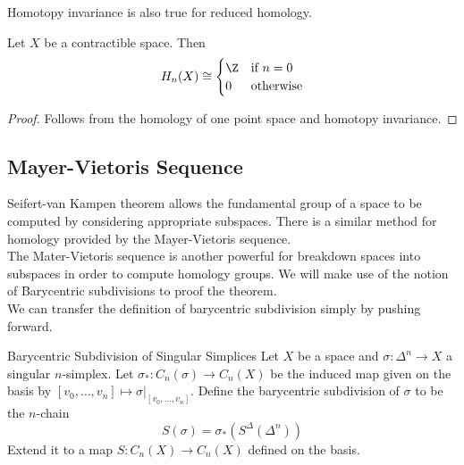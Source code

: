 \documentclass[a4paper]{article}
\begin{document}
Homotopy invariance is also true for reduced homology. 

\begin{eg}{}{} Let $X$ be a contractible space. Then $$H_n(X)\cong\begin{cases}
\Z & \text{if } n=0\\
0 & \text{otherwise}
\end{cases}$$ 
\begin{proof}
Follows from the homology of one point space and homotopy invariance. 
\end{proof}
\end{eg}

\subsection{Mayer-Vietoris Sequence}
Seifert-van Kampen theorem allows the fundamental group of a space to be computed by considering appropriate subspaces. There is a similar method for homology provided by the Mayer-Vietoris sequence. \\

The Mater-Vietoris sequence is another powerful for breakdown spaces into subspaces in order to compute homology groups. We will make use of the notion of Barycentric subdivisions to proof the theorem. \\

We can transfer the definition of barycentric subdivision simply by pushing forward. 

\begin{defn}{Barycentric Subdivision of Singular Simplices}{} Let $X$ be a space and $\sigma:\Delta^n\to X$ a singular $n$-simplex. Let $\sigma_\ast:C_n(\sigma)\to C_n(X)$ be the induced map given on the basis by $[v_0,\dots,v_n]\mapsto\sigma|_{[v_0,\dots,v_n]}$. Define the barycentric subdivision of $\sigma$ to be the $n$-chain $$S(\sigma)=\sigma_\ast(S^\Delta(\Delta^n))$$ Extend it to a map $S:C_n(X)\to C_n(X)$ defined on the basis. 
\end{defn}
\end{document}

